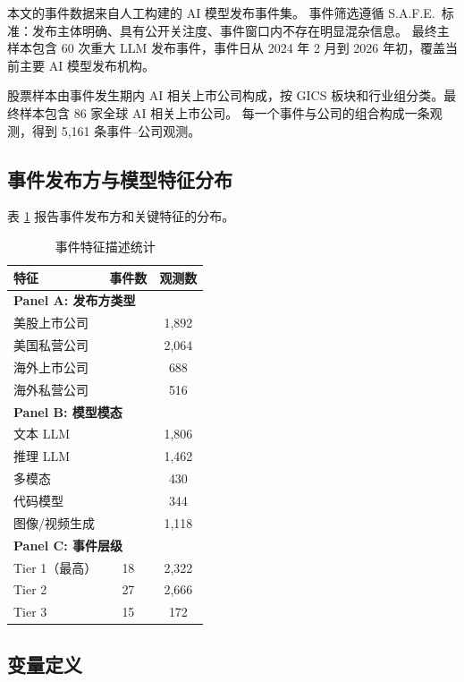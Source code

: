 \documentclass[11pt,fontset=fandol,a4paper]{ctexart}
\begin{document}
本文的事件数据来自人工构建的 AI 模型发布事件集。
事件筛选遵循 S.A.F.E.\ 标准：发布主体明确、具有公开关注度、事件窗口内不存在明显混杂信息。
最终主样本包含 60 次重大 LLM 发布事件，事件日从 2024 年 2 月到 2026 年初，覆盖当前主要 AI 模型发布机构。

股票样本由事件发生期内 AI 相关上市公司构成，按 GICS 板块和行业组分类。最终样本包含 86 家全球 AI 相关上市公司。
每一个事件与公司的组合构成一条观测，得到 5{,}161 条事件--公司观测。

\subsection{事件发布方与模型特征分布}

表 \ref{tab:event_dist} 报告事件发布方和关键特征的分布。
\begin{table}[htbp]
\centering
\caption{事件特征描述统计}
\label{tab:event_dist}
\small
\begin{tabular}{lcc}
\toprule
特征 & 事件数 & 观测数 \\
\midrule
\multicolumn{3}{l}{\textbf{Panel A: 发布方类型}} \\
\quad 美股上市公司   &  & 1{,}892 \\
\quad 美国私营公司   &  & 2{,}064 \\
\quad 海外上市公司   &  &   688 \\
\quad 海外私营公司   &  &   516 \\
\midrule
\multicolumn{3}{l}{\textbf{Panel B: 模型模态}} \\
\quad 文本 LLM       &  & 1{,}806 \\
\quad 推理 LLM       &  & 1{,}462 \\
\quad 多模态         &  &   430 \\
\quad 代码模型       &  &   344 \\
\quad 图像/视频生成  &  & 1{,}118 \\
\midrule
\multicolumn{3}{l}{\textbf{Panel C: 事件层级}} \\
\quad Tier 1（最高） & 18 & 2{,}322 \\
\quad Tier 2          & 27 & 2{,}666 \\
\quad Tier 3          & 15 &   172 \\
\bottomrule
\end{tabular}
\end{table}

\subsection{变量定义}
\end{document}
